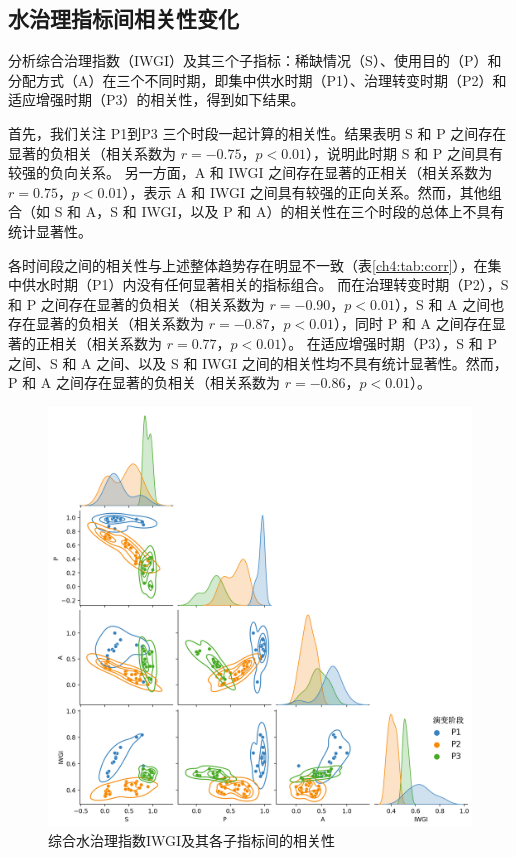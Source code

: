 
\subsection{水治理指标间相关性变化}

分析综合治理指数（IWGI）及其三个子指标：稀缺情况（S）、使用目的（P）和分配方式（A）在三个不同时期，即集中供水时期（P1）、治理转变时期（P2）和适应增强时期（P3）的相关性，得到如下结果。

首先，我们关注 P1到P3 三个时段一起计算的相关性。结果表明 S 和 P 之间存在显著的负相关（相关系数为 $r = -0.75$，$p < 0.01$），说明此时期 S 和 P 之间具有较强的负向关系。
另一方面，A 和 IWGI 之间存在显著的正相关（相关系数为 $r = 0.75$，$p < 0.01$），表示 A 和 IWGI 之间具有较强的正向关系。然而，其他组合（如 S 和 A，S 和 IWGI，以及 P 和 A）的相关性在三个时段的总体上不具有统计显著性。

各时间段之间的相关性与上述整体趋势存在明显不一致（表\ref{ch4:tab:corr}），在集中供水时期（P1）内没有任何显著相关的指标组合。
而在治理转变时期（P2），S 和 P 之间存在显著的负相关（相关系数为 $r = -0.90$，$p < 0.01$），S 和 A 之间也存在显著的负相关（相关系数为 $r = -0.87$，$p < 0.01$），同时 P 和 A 之间存在显著的正相关（相关系数为 $r = 0.77$，$p < 0.01$）。
在适应增强时期（P3），S 和 P 之间、S 和 A 之间、以及 S 和 IWGI 之间的相关性均不具有统计显著性。然而，P 和 A 之间存在显著的负相关（相关系数为 $r = -0.86$，$p < 0.01$）。

\begin{figure}[!h]
    \centering
    \includegraphics[width=\textwidth]{img/ch4/ch4_correlation.png}
    \caption{综合水治理指数IWGI及其各子指标间的相关性}\label{ch4:fig:corr}
\end{figure}

